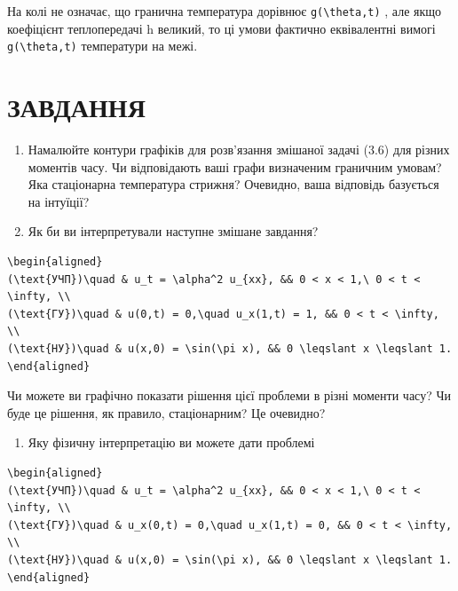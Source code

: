 \documentclass[
  ukrainian,
]{article}
\providecommand{\tightlist}{%
  \setlength{\itemsep}{0pt}\setlength{\parskip}{0pt}}
\begin{document}
На колі не означає, що гранична температура дорівнює
\texttt{g(\textbackslash{}theta,t)} , але якщо коефіцієнт теплопередачі
h великий, то ці умови фактично еквівалентні вимогі
\texttt{g(\textbackslash{}theta,t)} температури на межі.

\section{ЗАВДАННЯ}\label{ux437ux430ux432ux434ux430ux43dux43dux44f-2}

\begin{enumerate}
\def\labelenumi{\arabic{enumi}.}
\item
  Намалюйте контури графіків для розв'язання змішаної задачі (3.6) для
  різних моментів часу. Чи відповідають ваші графи визначеним граничним
  умовам? Яка стаціонарна температура стрижня? Очевидно, ваша відповідь
  базується на інтуїції?
\item
  Як би ви інтерпретували наступне змішане завдання?
\end{enumerate}

\begin{verbatim}
\begin{aligned}
(\text{УЧП})\quad & u_t = \alpha^2 u_{xx}, && 0 < x < 1,\ 0 < t < \infty, \\
(\text{ГУ})\quad & u(0,t) = 0,\quad u_x(1,t) = 1, && 0 < t < \infty, \\
(\text{НУ})\quad & u(x,0) = \sin(\pi x), && 0 \leqslant x \leqslant 1.
\end{aligned}
\end{verbatim}

Чи можете ви графічно показати рішення цієї проблеми в різні моменти
часу? Чи буде це рішення, як правило, стаціонарним? Це очевидно?

\begin{enumerate}
\def\labelenumi{\arabic{enumi}.}
\setcounter{enumi}{2}
\tightlist
\item
  Яку фізичну інтерпретацію ви можете дати проблемі
\end{enumerate}

\begin{verbatim}
\begin{aligned}
(\text{УЧП})\quad & u_t = \alpha^2 u_{xx}, && 0 < x < 1,\ 0 < t < \infty, \\
(\text{ГУ})\quad & u_x(0,t) = 0,\quad u_x(1,t) = 0, && 0 < t < \infty, \\
(\text{НУ})\quad & u(x,0) = \sin(\pi x), && 0 \leqslant x \leqslant 1.
\end{aligned}
\end{verbatim}
\end{document}
